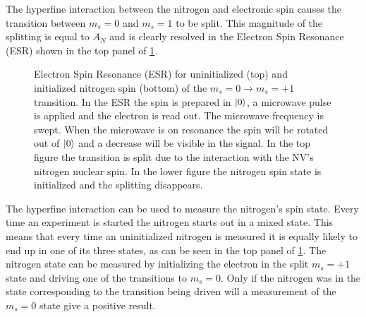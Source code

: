 The hyperfine interaction between the nitrogen and electronic spin causes the transition between $m_s=0$ and $m_s =1$ to be split.
This magnitude of the splitting is equal to $A_N$ and  is clearly resolved in the Electron Spin Resonance (ESR) shown in the top panel of \cref{fig:HF_split_levels}.


    \begin{figure}[htbp]
    \centering
        \caption{ Electron Spin Resonance (ESR) for uninitialized (top) and initialized nitrogen spin (bottom) of the $m_s =0 \rightarrow m_s = +1$ transition. In the ESR the spin is prepared in ${\left\vert{0}\right\rangle}$, a microwave pulse is applied and the electron is read out.
        The microwave frequency is swept.
        When the microwave is on resonance the spin will be rotated out of ${\left\vert{0}\right\rangle} $ and a decrease will be visible in the signal.
        In the top figure the transition is split due to the interaction with the NV's nitrogen nuclear spin.
        In the lower figure the nitrogen spin state is initialized and the splitting disappears.}
        \label{fig:HF_split_levels}
    \end{figure}

The hyperfine interaction can be used to measure the nitrogen's spin state.
Every time an experiment is started the nitrogen starts out in a mixed state.
This means that every time an uninitialized nitrogen is measured it is equally likely to end up in one of its three states, as can be seen in the top panel of \cref{fig:HF_split_levels}.
The nitrogen state can be measured by initializing the electron in the split $m_s = +1$ state and driving one of the transitions to $m_s=0$.
Only if the nitrogen was in the state corresponding to the transition being driven will a measurement of the $m_s =0$ state give a positive result.

